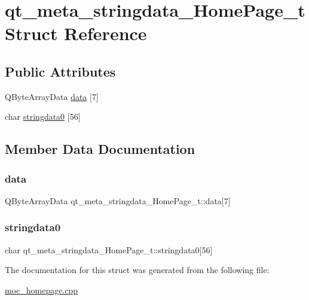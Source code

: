 \hypertarget{structqt__meta__stringdata__HomePage__t}{}\section{qt\+\_\+meta\+\_\+stringdata\+\_\+\+Home\+Page\+\_\+t Struct Reference}
\label{structqt__meta__stringdata__HomePage__t}
\subsection*{Public Attributes}
\begin{DoxyCompactItemize}
\item 
Q\+Byte\+Array\+Data \mbox{\hyperlink{structqt__meta__stringdata__HomePage__t_aff85ca00cac16a922f43bd225a05ae8a}{data}} \mbox{[}7\mbox{]}
\item 
char \mbox{\hyperlink{structqt__meta__stringdata__HomePage__t_a1f09d3ac60e9e4c6e155ca7f9ab79e0f}{stringdata0}} \mbox{[}56\mbox{]}
\end{DoxyCompactItemize}


\subsection{Member Data Documentation}
\mbox{\label{structqt__meta__stringdata__HomePage__t_aff85ca00cac16a922f43bd225a05ae8a}} 
\subsubsection{\texorpdfstring{data}{data}}
{\footnotesize\ttfamily Q\+Byte\+Array\+Data qt\+\_\+meta\+\_\+stringdata\+\_\+\+Home\+Page\+\_\+t\+::data\mbox{[}7\mbox{]}}

\mbox{\label{structqt__meta__stringdata__HomePage__t_a1f09d3ac60e9e4c6e155ca7f9ab79e0f}} 
\subsubsection{\texorpdfstring{stringdata0}{stringdata0}}
{\footnotesize\ttfamily char qt\+\_\+meta\+\_\+stringdata\+\_\+\+Home\+Page\+\_\+t\+::stringdata0\mbox{[}56\mbox{]}}



The documentation for this struct was generated from the following file\+:\begin{DoxyCompactItemize}
\item 
\mbox{\hyperlink{moc__homepage_8cpp}{moc\+\_\+homepage.\+cpp}}\end{DoxyCompactItemize}
